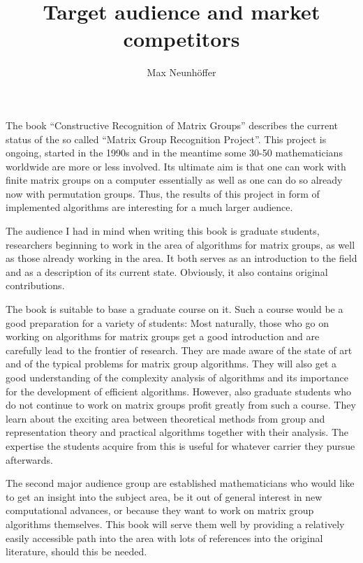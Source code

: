 \documentclass[11pt]{article}
\begin{document}
\title{Target audience and market competitors}
\author{Max Neunh\"offer}
\maketitle

The book ``Constructive Recognition of Matrix Groups'' describes the
current status of the so called ``Matrix Group Recognition Project''.
This project is ongoing, started in the 1990s and in the meantime
some 30-50 mathematicians worldwide are more or less involved.
Its ultimate aim is that one can work with finite matrix groups
on a computer essentially as well as one can do so already now with
permutation groups. Thus, the results of this project in form of
implemented algorithms are interesting for a much larger audience.

The audience I had in mind when writing this book is graduate
students, researchers beginning to work in the area of
algorithms for matrix groups, as well as those already working
in the area. It both serves as an introduction to the field and
as a description of its current state. Obviously, it also contains
original contributions.

The book is suitable to base a graduate course on it. Such a course
would be a good preparation for a variety of students: Most naturally, 
those who go on working on algorithms for matrix groups get
a good introduction and are carefully lead to the frontier of research.
They are made aware of the state of art and of the typical problems
for matrix group algorithms. They will also get a good understanding
of the complexity analysis of algorithms and its importance for the
development of efficient algorithms.
However, also graduate students who do not continue to work
on matrix groups profit greatly from such a course. They learn about 
the exciting area between theoretical methods from group and representation
theory and practical algorithms together with their analysis. The expertise
the students acquire from this is useful for whatever carrier they pursue
afterwards.

The second major audience group are established mathematicians who would
like to get an insight into the subject area, be it out of general interest
in new computational advances, or because they want to work on matrix
group algorithms themselves. This book will serve them well by providing
a relatively easily accessible path into the area with lots of references
into the original literature, should this be needed.
\end{document}
